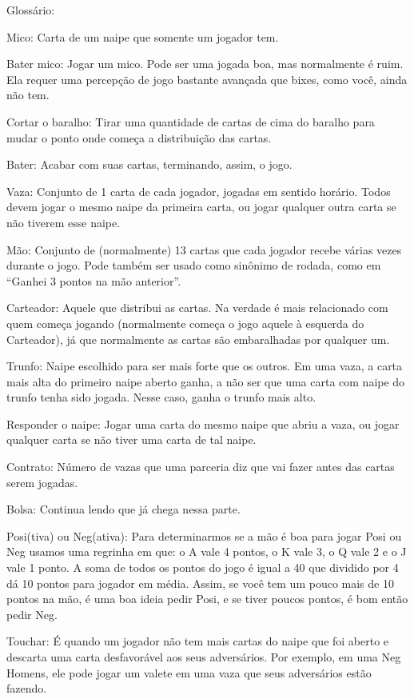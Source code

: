\begin{subsecao}{Glossário:}

Mico: Carta de um naipe que somente um jogador tem.

Bater mico: Jogar um mico. Pode ser uma jogada boa, mas normalmente é
ruim. Ela requer uma percepção de jogo bastante avançada que bixes,
como você, ainda não tem.

Cortar o baralho: Tirar uma quantidade de cartas de cima do baralho para mudar
o ponto onde começa a distribuição das cartas.

Bater: Acabar com suas cartas, terminando, assim, o jogo.

Vaza: Conjunto de 1 carta de cada jogador, jogadas em sentido horário. Todos
devem jogar o mesmo naipe da primeira carta, ou jogar qualquer outra carta se
não tiverem esse naipe.

Mão: Conjunto de (normalmente) 13 cartas que cada jogador recebe várias vezes
durante o jogo. Pode também ser usado como sinônimo de rodada, como
em ``Ganhei 3 pontos na mão anterior''.

Carteador: Aquele que distribui as cartas. Na verdade é mais relacionado com
quem começa jogando (normalmente começa o jogo aquele à esquerda do Carteador),
já que normalmente as cartas são embaralhadas por qualquer um.

Trunfo: Naipe escolhido para ser mais forte que os outros. Em uma vaza, a carta
mais alta do primeiro naipe aberto ganha, a não ser que uma carta com naipe do
trunfo tenha sido jogada. Nesse caso, ganha o trunfo mais alto.

Responder o naipe: Jogar uma carta do mesmo naipe que abriu a vaza, ou jogar
qualquer carta se não tiver uma carta de tal naipe.

Contrato: Número de vazas que uma parceria diz que vai fazer antes das cartas
serem jogadas.

Bolsa: Continua lendo que já chega nessa parte.

Posi(tiva) ou Neg(ativa): Para determinarmos se a mão é boa para jogar Posi ou
Neg usamos uma regrinha em que: o A vale 4 pontos, o K vale 3, o Q vale 2 e o J
vale 1 ponto. A soma de todos os pontos do jogo é igual a 40 que dividido por 4
dá 10 pontos para jogador em média. Assim, se você tem um pouco mais de 10
pontos na mão, é uma boa ideia pedir Posi, e se tiver poucos pontos, é bom
então pedir Neg.

Touchar: É quando um jogador não tem mais cartas do naipe que foi aberto e
descarta uma carta desfavorável aos seus adversários. Por exemplo, em uma Neg
Homens, ele pode jogar um valete em uma vaza que seus adversários estão fazendo.


\end{subsecao}
